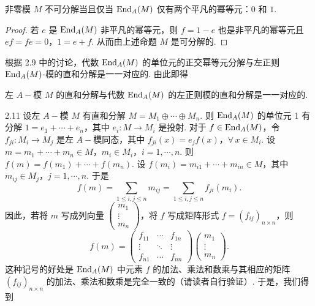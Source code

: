 \begin{corollary}
    非零模 $M$ 不可分解当且仅当 $\operatorname{End}_A(M)$ 仅有两个平凡的幂等元：$0$ 和 $1$.
\end{corollary}

\begin{proof}
    若 $e$ 是 $\operatorname{End}_A(M)$ 非平凡的幂等元，则 $f=1-e$ 也是非平凡的幂等元且 $ef=fe=0$，$1=e+f$. 从而由上述命题 $M$ 是可分解的.
\end{proof}

根据 2.9 中的讨论，代数 $\operatorname{End}_A(M)$ 的单位元的正交幂等元分解与左正则 $\operatorname{End}_A(M)$-模的直和分解是一一对应的. 由此即得

\begin{corollary}
    左 $A-\!\!$模 $M$ 的直和分解与代数 $\operatorname{End}_A(M)$ 的左正则模的直和分解是一一对应的.
\end{corollary}


2.11 设左 $A-\!\!$模 $M$ 有直和分解 $M=M_1\oplus\cdots\oplus M_n$. 则 $\operatorname{End}_A(M)$ 的单位元 1 有分解 $1=e_1+\cdots+e_n$，其中 $e_i: M\longrightarrow M_i$ 是投射. 对于 $f\in\operatorname{End}_A(M)$，令 $f_{ji}: M_i\longrightarrow M_j$ 是左 $A-\!\!$模同态，其中 $f_{ji}(x)=e_jf(x)$，$\forall\, x\in M_i$.
设 $m=m_1+\cdots+m_n\in M$，$m_i\in M_i$，$i=1,\cdots,n$. 则 $f(m)=f(m_1)+\cdots+f(m_n)$. 设 $f(m_i)=m_{i1}+\cdots+m_{in}\in M$，其中 $m_{ij}\in M_j$，$j=1,\cdots,n$. 于是
\[
f(m)=\sum_{1\le i,j\le n} m_{ij} = \sum_{1\le i,j\le n} f_{ji}(m_i).
\]
因此，若将 $m$ 写成列向量 $\begin{pmatrix} m_1 \\ \vdots \\ m_n \end{pmatrix}$，将 $f$ 写成矩阵形式 $f=(f_{ij})_{n\times n}$，则
\[
f(m)=\begin{pmatrix} f_{11} & \cdots & f_{1n} \\ \vdots & \ddots & \vdots \\ f_{n1} & \cdots & f_{nn} \end{pmatrix}\begin{pmatrix} m_1 \\ \vdots \\ m_n \end{pmatrix}.
\]
这种记号的好处是 $\operatorname{End}_A(M)$ 中元素 $f$ 的加法、乘法和数乘与其相应的矩阵 $(f_{ij})_{n\times n}$ 的加法、乘法和数乘是完全一致的（请读者自行验证）. 于是，我们得到


